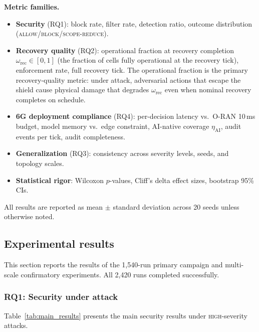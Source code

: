 \documentclass[10pt,journal,compsoc]{IEEEtran}
\begin{document}
\noindent\textbf{Metric families.}
\begin{itemize}
    \item \textbf{Security} (RQ1): block rate, filter rate, detection ratio, outcome distribution (\textsc{allow}/\textsc{block}/\textsc{scope-reduce}).
    \item \textbf{Recovery quality} (RQ2): operational fraction at recovery completion $\omega_{\mathrm{rec}} \in [0,1]$ (the fraction of cells fully operational at the recovery tick), enforcement rate, full recovery tick.
    The operational fraction is the primary recovery-quality metric: under attack, adversarial actions that escape the shield cause physical damage that degrades $\omega_{\mathrm{rec}}$ even when nominal recovery completes on schedule.
    \item \textbf{6G deployment compliance} (RQ4): per-decision latency vs.\ O-RAN 10\,ms budget, model memory vs.\ edge constraint, AI-native coverage $\eta_{\mathrm{AI}}$, audit events per tick, audit completeness.
    \item \textbf{Generalization} (RQ3): consistency across severity levels, seeds, and topology scales.
    \item \textbf{Statistical rigor}: Wilcoxon $p$-values, Cliff's delta effect sizes, bootstrap 95\% CIs.
\end{itemize}

All results are reported as mean $\pm$ standard deviation across 20 seeds unless otherwise noted.


\subsection{Experimental results}
\label{sec:experiments}

This section reports the results of the 1,540-run primary campaign and multi-scale confirmatory experiments.
All 2,420 runs completed successfully.

\subsubsection{RQ1: Security under attack}

Table~\ref{tab:main_results} presents the main security results under \textsc{high}-severity attacks.
\end{document}
